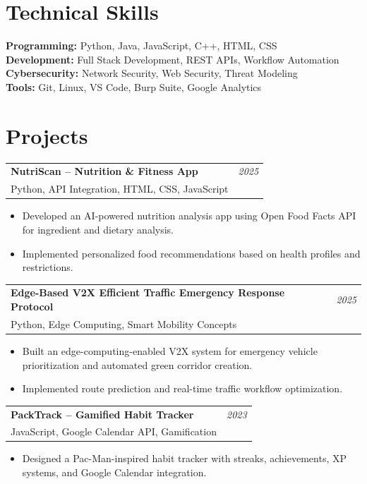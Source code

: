 \documentclass[letterpaper,10pt]{article}
\makeatletter
\newcommand{\resumeItem}[1]{
  \item \small{#1}
}
\newcommand{\resumeSubheading}[4]{
\vspace{2pt}
\begin{tabular*}{\textwidth}{l@{\extracolsep{\fill}}r}
\textbf{#1} & \textit{#2} \\
{\small #3} & {\small #4} \\
\end{tabular*}
\vspace{2pt}
}
\makeatother
\begin{document}
\section{Technical Skills}

\small{
\textbf{Programming:} Python, Java, JavaScript, C++, HTML, CSS \\

\textbf{Development:} Full Stack Development, REST APIs, Workflow Automation \\

\textbf{Cybersecurity:} Network Security, Web Security, Threat Modeling \\

\textbf{Tools:} Git, Linux, VS Code, Burp Suite, Google Analytics \\

}

\section{Projects}

\resumeSubheading
{NutriScan -- Nutrition \& Fitness App}{2025}
{Python, API Integration, HTML, CSS, JavaScript}{}
\begin{itemize}

\resumeItem{Developed an AI-powered nutrition analysis app using Open Food Facts API for ingredient and dietary analysis.}

\resumeItem{Implemented personalized food recommendations based on health profiles and restrictions.}

\end{itemize}

\resumeSubheading
{Edge-Based V2X Efficient Traffic Emergency Response Protocol}{2025}
{Python, Edge Computing, Smart Mobility Concepts}{}
\begin{itemize}

\resumeItem{Built an edge-computing-enabled V2X system for emergency vehicle prioritization and automated green corridor creation.}

\resumeItem{Implemented route prediction and real-time traffic workflow optimization.}

\end{itemize}

\resumeSubheading
{PackTrack -- Gamified Habit Tracker}{2023}
{JavaScript, Google Calendar API, Gamification}{}
\begin{itemize}

\resumeItem{Designed a Pac-Man-inspired habit tracker with streaks, achievements, XP systems, and Google Calendar integration.}

\end{itemize}
\end{document}
